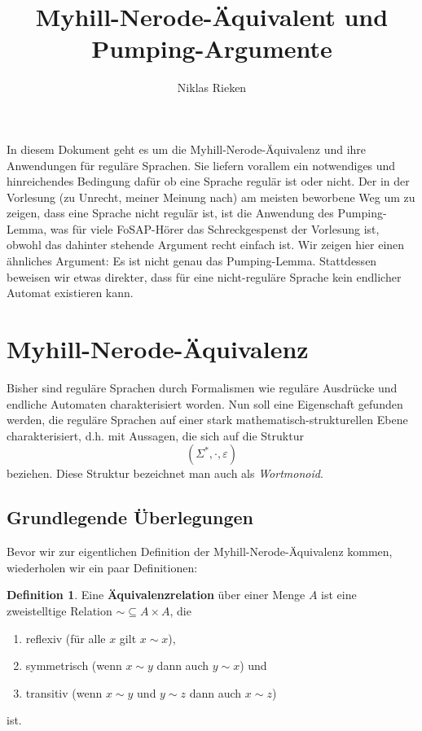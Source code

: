 \documentclass[11pt, a4paper]{article}
\author{Niklas Rieken}
\title{Myhill-Nerode-Äquivalent und Pumping-Argumente}
\theoremstyle{definition}
\newtheorem{definition}{Definition}
\theoremstyle{plain}
\begin{document}
\maketitle

In diesem Dokument geht es um die Myhill-Nerode-Äquivalenz und ihre Anwendungen für reguläre Sprachen. Sie liefern vorallem ein notwendiges und hinreichendes Bedingung dafür ob eine Sprache regulär ist oder nicht. Der in der Vorlesung (zu Unrecht, meiner Meinung nach) am meisten beworbene Weg um zu zeigen, dass eine Sprache nicht regulär ist, ist die Anwendung des Pumping-Lemma, was für viele FoSAP-Hörer das Schreckgespenst der Vorlesung ist, obwohl das dahinter stehende Argument recht einfach ist. Wir zeigen hier einen ähnliches Argument: Es ist nicht genau das Pumping-Lemma. Stattdessen beweisen wir etwas direkter, dass für eine nicht-reguläre Sprache kein endlicher Automat existieren kann.

\section*{Myhill-Nerode-Äquivalenz}
Bisher sind reguläre Sprachen durch Formalismen wie reguläre Ausdrücke und endliche Automaten charakterisiert worden. Nun soll eine Eigenschaft gefunden werden, die reguläre Sprachen auf einer stark mathematisch-struk\-tur\-ellen Ebene charakterisiert, d.h. mit Aussagen, die sich auf die Struktur
\[
	(\Sigma^\ast, \cdot, \varepsilon)
\]
beziehen. Diese Struktur bezeichnet man auch als \textit{Wortmonoid}.

\subsection*{Grundlegende Überlegungen}
Bevor wir zur eigentlichen Definition der Myhill-Nerode-Äquivalenz kommen, wiederholen wir ein paar Definitionen:
\begin{definition}
	Eine \textbf{Äquivalenzrelation} über einer Menge \( A \) ist eine zweistelltige Relation \( \sim \subseteq A \times A \), die 
	\begin{enumerate}
		\item reflexiv (für alle \( x \) gilt \( x \sim x \)),
		\item symmetrisch (wenn \( x \sim y \) dann auch \( y \sim  x \)) und
		\item transitiv (wenn \( x \sim y \) und \( y \sim z \) dann auch \( x \sim z \)) 
	\end{enumerate}
	ist.
\end{definition}
\end{document}
